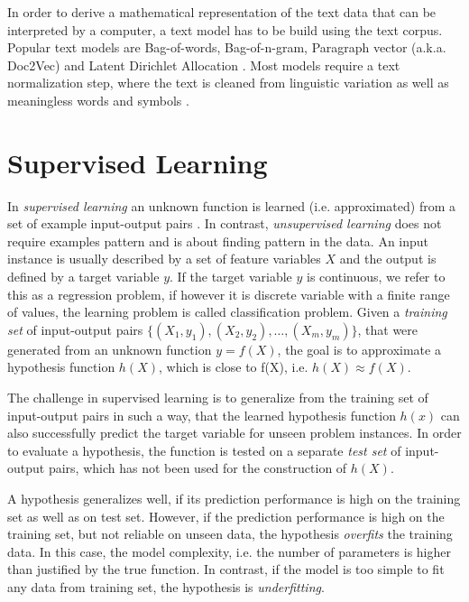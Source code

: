 In order to derive a mathematical representation of the text data that can be interpreted by a computer, a text model has to be build using the text corpus.
Popular text models are Bag-of-words, Bag-of-n-gram, Paragraph vector (a.k.a. Doc2Vec) \cite{DBLP:conf/icml/LeM14} and Latent Dirichlet Allocation \cite{DBLP:journals/jmlr/BleiNJ03}.
Most models require a text normalization step, where the text is cleaned from linguistic variation as well as meaningless words and symbols \cite{DBLP:books/lib/JurafskyM09}.

\section{Supervised Learning}

In \textit{supervised learning} an unknown function is learned (i.e. approximated) from a set of example input-output pairs \cite{DBLP:books/daglib/0023820}.
In contrast, \textit{unsupervised learning} does not require examples pattern and is about finding pattern in the data. 
An input instance is usually described by a set of feature variables $X$ and the output is defined by a target variable $y$.
If the target variable $y$ is continuous, we refer to this as a regression problem, if however it is discrete variable with a finite range of values, the learning problem is called classification problem.
Given a \textit{training set} of input-output pairs $\{(X_1, y_1), (X_2, y_2), \dots, (X_m,y_m)\}$, that were generated from an unknown function $y = f(X)$, the goal is to approximate a hypothesis function $h(X)$, which is close to f(X), i.e. $h(X) \approx f(X)$.

The challenge in supervised learning is to generalize from the training set of input-output pairs in such a way, that the learned hypothesis function $h(x)$ can also successfully predict the target variable for unseen problem instances.
In order to evaluate a hypothesis, the function is tested on a separate \textit{test set} of input-output pairs, which has not been used for the construction of $h(X)$.

A hypothesis generalizes well, if its prediction performance is high on the training set as well as on test set.
However, if the prediction performance is high on the training set, but not reliable on unseen data, the hypothesis \textit{overfits} the training data.
In this case, the model complexity, i.e. the number of parameters is higher than justified by the true function. 
In contrast, if the model is too simple to fit any data from training set, the hypothesis is \textit{underfitting}.

